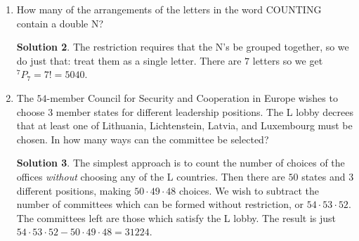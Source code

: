\documentclass{article}
\theoremstyle{definition}
\newtheorem*{solution}{Solution}
\begin{document}
\begin{multicols}{2}
\begin{enumerate}
            Find the sum of all four digit positive integer palindromes.
            (Hint: What is the sum of the first and last four digit palindromes?)
            \begin{solution}
                The list of all the palindromes would look like
                $1001, 1111, 1221, \dots, 9889, 9999$.
                Notice that if we add the first and the last, we get $11000$.
                The same holds if we add the second and the next-to-last and so on.
                Each such pair always sums to $11000$.
                So how many pairs are there?
                There are ten palindromes starting with each digit from $1$ to $9$,
                so there are $90$ palindromes.
                Hence, there are $45$ pairs and our desired sum is $45 \cdot 11000 = 495000$.
            \end{solution}
        \item How many of the arrangements of the letters in the word COUNTING contain
            a double N?
            \begin{solution}
                The restriction requires that the N's be grouped together,
                so we do just that: treat them as a single letter.
                There are $7$ letters so we get $^7P_7 = 7! = 5040$.
            \end{solution}
        \item The $54$-member Council for Security and Cooperation in Europe wishes to 
            choose $3$ member states for different leadership positions.
            The L lobby decrees that at least one of
            Lithuania, Lichtenstein, Latvia, and Luxembourg must be chosen.
            In how many ways can the committee be selected?
            \begin{solution}
                The simplest approach is to count the number of choices of the offices
                \emph{without} choosing any of the L countries.
                Then there are $50$ states and $3$ different positions,
                making $50 \cdot 49 \cdot 48$ choices.
                We wish to subtract the number of committees
                which can be formed without restriction, or $54 \cdot 53 \cdot 52$.
                The committees left are those which satisfy the L lobby.
                The result is just $54 \cdot 53 \cdot 52 - 50 \cdot 49 \cdot 48 = 31224$.
            \end{solution}
    \end{enumerate}
\end{multicols}
\end{document}
